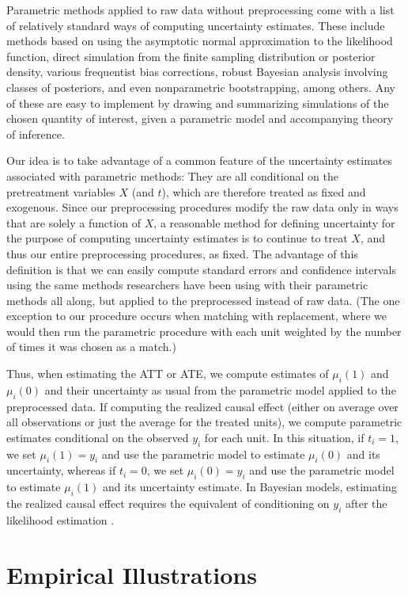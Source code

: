 \documentclass[11pt,titlepage]{article}
\begin{document}
Parametric methods applied to raw data without preprocessing come with
a list of relatively standard ways of computing uncertainty estimates.
These include methods based on using the asymptotic normal
approximation to the likelihood function, direct simulation from the
finite sampling distribution or posterior density, various frequentist
bias corrections, robust Bayesian analysis involving classes of
posteriors, and even nonparametric bootstrapping, among others.  Any
of these are easy to implement by drawing and summarizing simulations
of the chosen quantity of interest, given a parametric model and
accompanying theory of inference.

Our idea is to take advantage of a common feature of the uncertainty
estimates associated with parametric methods: They are all conditional
on the pretreatment variables $X$ (and $t$), which are therefore
treated as fixed and exogenous.  Since our preprocessing procedures
modify the raw data only in ways that are solely a function of $X$, a
reasonable method for defining uncertainty for the purpose of
computing uncertainty estimates is to continue to treat $X$, and thus
our entire preprocessing procedures, as fixed.  The advantage of this
definition is that we can easily compute standard errors and
confidence intervals using the same methods researchers have been
using with their parametric methods all along, but applied to the
preprocessed instead of raw data.  (The one exception to our procedure
occurs when matching with replacement, where we would then run the
parametric procedure with each unit weighted by the number of times it
was chosen as a match.)

Thus, when estimating the ATT or ATE, we compute estimates of
$\mu_i(1)$ and $\mu_i(0)$ and their uncertainty as usual from the
parametric model applied to the preprocessed data.  If computing the
realized causal effect (either on average over all observations or
just the average for the treated units), we compute parametric
estimates conditional on the observed $y_i$ for each unit.  In this
situation, if $t_i=1$, we set $\mu_i(1)=y_i$ and use the parametric
model to estimate $\mu_i(0)$ and its uncertainty, whereas if $t_i=0$,
we set $\mu_i(0)=y_i$ and use the parametric model to estimate
$\mu_i(1)$ and its uncertainty estimate.  In Bayesian models,
estimating the realized causal effect requires the equivalent of
conditioning on $y_i$ after the likelihood estimation \citep[as
in][]{King97}.

\section{Empirical Illustrations}
\end{document}
